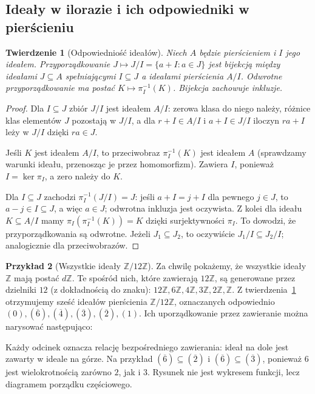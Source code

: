 \documentclass[11pt,a4paper,openany]{report}
\numberwithin{equation}{section}
\theoremstyle{plain}
\newtheorem{twierdzenie}{Twierdzenie}[section]
\theoremstyle{definition}
\newtheorem{przyklad}[twierdzenie]{Przykład}
\theoremstyle{remark}
\newcommand{\Z}{\mathbb Z}
\newcommand{\kerf}{\operatorname{ker}}
\begin{document}
\subsection{Ideały w ilorazie i ich odpowiedniki w pierścieniu}

\begin{twierdzenie}[Odpowiedniość ideałów]
\label{tw:odp-idealow}
Niech $A$ będzie pierścieniem i $I$ jego ideałem.
Przyporządkowanie $J\mapsto J/I=\{a+I:a\in J\}$ jest bijekcją
między ideałami $J\subseteq A$ spełniającymi $I\subseteq J$
a ideałami pierścienia $A/I$. Odwrotne przyporządkowanie ma postać
$K\mapsto\pi_I^{-1}(K)$. Bijekcja zachowuje inkluzje.
\end{twierdzenie}
\begin{proof}
Dla $I\subseteq J$ zbiór $J/I$ jest ideałem $A/I$:
zerowa klasa do niego należy, różnice klas elementów $J$ pozostają
w $J/I$, a dla $r+I\in A/I$ i $a+I\in J/I$ iloczyn
$ra+I$ leży w $J/I$ dzięki $ra\in J$.

Jeśli $K$ jest ideałem $A/I$, to przeciwobraz $\pi_I^{-1}(K)$ jest
ideałem $A$ (sprawdzamy warunki ideału, przenosząc je przez homomorfizm).
Zawiera $I$, ponieważ $I=\kerf\pi_I$, a zero należy do $K$.

Dla $I\subseteq J$ zachodzi
$\pi_I^{-1}(J/I)=J$: jeśli $a+I=j+I$ dla pewnego $j\in J$,
to $a-j\in I\subseteq J$, a więc $a\in J$; odwrotna inkluzja
jest oczywista. Z kolei dla ideału $K\subseteq A/I$ mamy
$\pi_I(\pi_I^{-1}(K))=K$ dzięki surjektywności $\pi_I$.
To dowodzi, że przyporządkowania są odwrotne.
Jeżeli $J_1\subseteq J_2$, to oczywiście $J_1/I\subseteq J_2/I$;
analogicznie dla przeciwobrazów.
\end{proof}

\begin{przyklad}[Wszystkie ideały $\Z/12\Z$]
Za chwilę pokażemy, że wszystkie ideały $\Z$ mają postać $d\Z$.
Te spośród nich, które zawierają $12\Z$, są generowane przez
dzielniki $12$ (z dokładnością do znaku):
$12\Z,6\Z,4\Z,3\Z,2\Z,\Z$.
Z twierdzenia~\ref{tw:odp-idealow} otrzymujemy sześć ideałów
pierścienia $\Z/12\Z$, oznaczanych odpowiednio
$(0),(\overline6),(\overline4),(\overline3),(\overline2),(1)$.
Ich uporządkowanie przez zawieranie można narysować następująco:
\end{przyklad}

\begin{center}
\end{center}
Każdy odcinek oznacza relację bezpośredniego zawierania:
ideał na dole jest zawarty w ideale na górze. Na przykład
$(\overline6)\subseteq(\overline2)$ i
$(\overline6)\subseteq(\overline3)$, ponieważ $6$ jest wielokrotnością
zarówno $2$, jak i $3$. Rysunek nie jest wykresem funkcji,
lecz diagramem porządku częściowego.
\end{document}
